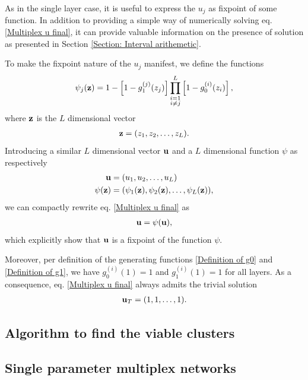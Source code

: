 \documentclass[
11pt, %
english, %
singlespacing, %
nolistspacing, %
liststotoc, %
headsepline, %
]{MastersDoctoralThesis} %
\begin{document}
As in the single layer case, it is useful to express the $u_j$ as fixpoint of some function. In addition to providing a simple way of numerically solving eq. \eqref{Multiplex u final}, it can provide valuable information on the presence of solution as presented in Section \ref{Section: Interval arithemetic}.

To make the fixpoint nature of the $u_j$ manifest, we define the functions
\begin{align}
	\psi_j(\boldsymbol{\mathrm{z}}) = 1 - \left[1 - g_1^{(j)}(z_j) \right] \prod_{\substack{i = 1 \\ i \neq j}}^{L}  \left[1 - g_0^{(i)}(z_i) \right], \label{Definition of psi functions}
\end{align}
where $\boldsymbol{\mathrm{z}}$ is the $L$ dimensional vector
\begin{align}
	\boldsymbol{\mathrm{z}} = (z_1, z_2, \dots, z_L).
\end{align}
Introducing a similar $L$ dimensional vector $\boldsymbol{\mathrm{u}}$ and a $L$ dimensional function $\psi$ as respectively
\begin{align}
	\boldsymbol{\mathrm{u}} &= (u_1, u_2, \dots, u_L) \\
	\psi(\boldsymbol{\mathrm{z}}) &= (\psi_1(\boldsymbol{\mathrm{z}}), \psi_2(\boldsymbol{\mathrm{z}}), \dots, \psi_L(\boldsymbol{\mathrm{z}})),
\end{align}
we can compactly rewrite eq. \eqref{Multiplex u final} as
\begin{align}
	\boldsymbol{\mathrm{u}} = \psi(\boldsymbol{\mathrm{u}}), \label{uvec as a fixpoint of psi}
\end{align}
which explicitly show that $\boldsymbol{\mathrm{u}}$ is a fixpoint of the function $\psi$.

Moreover, per definition of the generating functions \eqref{Definition of g0} and \eqref{Definition of g1}, we have $g^{(i)}_0(1) = 1$ and $g^{(i)}_1(1) = 1$ for all layers. As a consequence, eq. \eqref{Multiplex u final} always admits the trivial solution
\begin{align}
	\boldsymbol{\mathrm{u}}_T = (1, 1, \dots, 1). \label{Definition of multiplex trivial solution}
\end{align}


\subsection{Algorithm to find the viable clusters}

\subsection{Single parameter multiplex networks}
\end{document}
